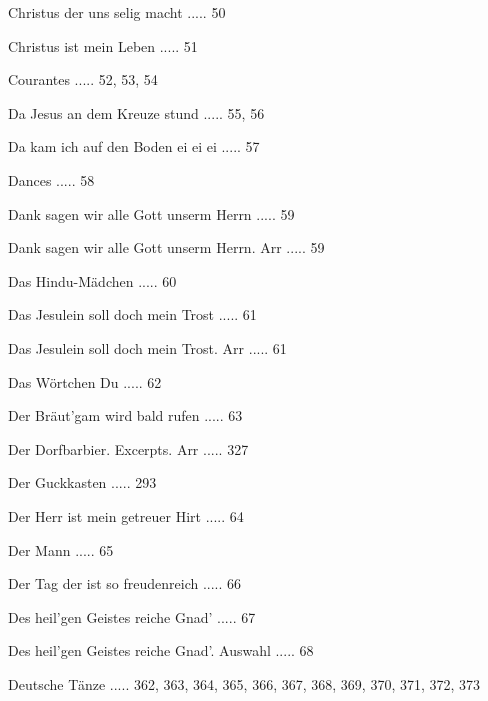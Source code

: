 \documentclass[twocolumn]{book}
\begin{document}
\newline 
Christus der uns selig macht ..... 50

\newline 
Christus ist mein Leben ..... 51

\newline 
Courantes ..... 52, 53, 54

\newline 
Da Jesus an dem Kreuze stund ..... 55, 56

\newline 
Da kam ich auf den Boden ei ei ei ..... 57

\newline 
Dances ..... 58

\newline 
Dank sagen wir alle Gott unserm Herrn ..... 59

\newline 
Dank sagen wir alle Gott unserm Herrn. Arr ..... 59

\newline 
Das Hindu-Mädchen ..... 60

\newline 
Das Jesulein soll doch mein Trost ..... 61

\newline 
Das Jesulein soll doch mein Trost. Arr ..... 61

\newline 
Das Wörtchen Du ..... 62

\newline 
Der Bräut'gam wird bald rufen ..... 63

\newline 
Der Dorfbarbier. Excerpts. Arr ..... 327

\newline 
Der Guckkasten ..... 293

\newline 
Der Herr ist mein getreuer Hirt ..... 64

\newline 
Der Mann ..... 65

\newline 
Der Tag der ist so freudenreich ..... 66

\newline 
Des heil'gen Geistes reiche Gnad' ..... 67

\newline 
Des heil'gen Geistes reiche Gnad'. Auswahl ..... 68

\newline 
Deutsche Tänze ..... 362, 363, 364, 365, 366, 367, 368, 369, 370, 371, 372, 373
\end{document}
